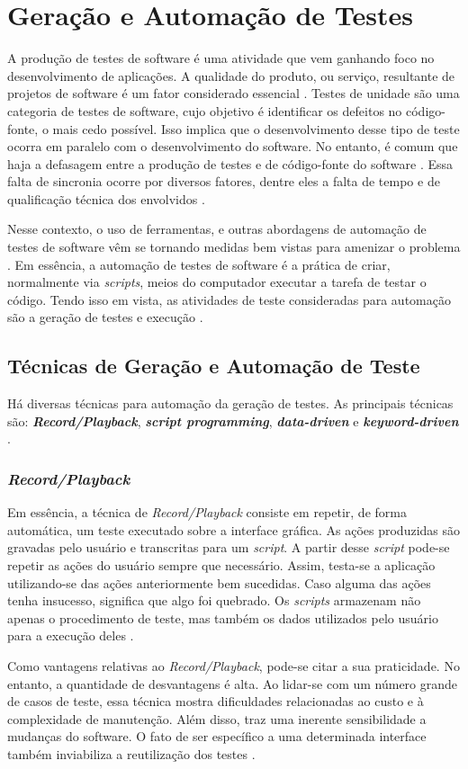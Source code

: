 \section{Geração e Automação de Testes}
A produção de testes de software é uma atividade que vem ganhando foco no
desenvolvimento de aplicações. A qualidade do produto, ou serviço, resultante
de projetos de software é um fator considerado essencial \cite{barbosaEtAl2009}.
Testes de unidade são uma categoria de testes de software, cujo objetivo é
identificar os defeitos no código-fonte, o mais cedo possível. Isso implica que
o desenvolvimento desse tipo de teste ocorra em paralelo com o desenvolvimento
do software. No entanto, é comum que haja a defasagem entre a produção de testes
e de código-fonte do software \cite{fantinatoEtAl2004}. Essa falta de sincronia
ocorre por diversos fatores, dentre eles a falta de tempo e de qualificação
técnica dos envolvidos \cite{fantinatoEtAl2004}.
\par
\indent Nesse contexto, o uso de ferramentas, e outras abordagens de automação
de testes de software vêm se tornando medidas bem vistas para amenizar o problema
\cite{fantinatoEtAl2004}. Em essência, a automação de testes de software é a prática
de criar, normalmente via \textit{scripts}, meios do computador executar a tarefa
de testar o código. Tendo isso em vista, as atividades de teste consideradas para
automação são a geração de testes e execução \cite{fantinatoEtAl2004}.

\subsection{Técnicas de Geração e Automação de Teste}
Há diversas técnicas para automação da geração de testes. As principais técnicas
são: \textbf{\textit{Record/Playback}}, \textbf{\textit{script programming}},
\textbf{\textit{data-driven}} e \textbf{\textit{keyword-driven}}
\cite{fantinatoEtAl2004}.
\subsubsection{\textit{Record/Playback}}
Em essência, a técnica de \textit{Record/Playback} consiste em repetir, de forma
automática, um teste executado sobre a interface gráfica. As ações produzidas
são gravadas pelo usuário e transcritas para um \textit{script}. A partir desse
\textit{script} pode-se repetir as ações do usuário sempre que necessário. Assim,
testa-se a aplicação utilizando-se das ações anteriormente bem sucedidas. Caso
alguma das ações tenha insucesso, significa que algo foi quebrado. Os \textit{scripts}
armazenam não apenas o procedimento de teste, mas também os dados utilizados pelo
usuário para a execução deles \cite{kent2007}.
\par
\indent Como vantagens relativas ao \textit{Record/Playback}, pode-se citar a
sua praticidade. No entanto, a quantidade de desvantagens é alta. Ao lidar-se
com um número grande de casos de teste, essa técnica mostra dificuldades
relacionadas ao custo e à complexidade de manutenção. Além disso, traz uma
inerente sensibilidade a mudanças do software. O fato de ser específico a uma
determinada interface também inviabiliza a reutilização dos testes \cite{fantinatoEtAl2004}.
